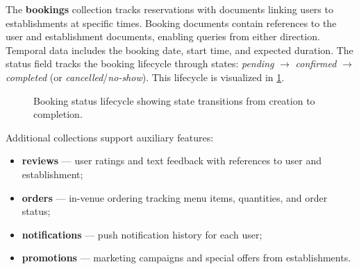 The \textbf{bookings} collection tracks reservations with documents linking users to establishments at specific times.
Booking documents contain references to the user and establishment documents, enabling queries from either direction.
Temporal data includes the booking date, start time, and expected duration.
The status field tracks the booking lifecycle through states: \textit{pending} $\to$ \textit{confirmed} $\to$ \textit{completed} (or \textit{cancelled}/\textit{no-show}).
This lifecycle is visualized in \cref{fig:booking-lifecycle}.

\begin{figure}[htbp]
  \centering
  \caption{Booking status lifecycle showing state transitions from creation to completion.}
  \label{fig:booking-lifecycle}
\end{figure}

Additional collections support auxiliary features:
\begin{itemize}
  \item \textbf{reviews} --- user ratings and text feedback with references to user and establishment;
  \item \textbf{orders} --- in-venue ordering tracking menu items, quantities, and order status;
  \item \textbf{notifications} --- push notification history for each user;
  \item \textbf{promotions} --- marketing campaigns and special offers from establishments.
\end{itemize}


